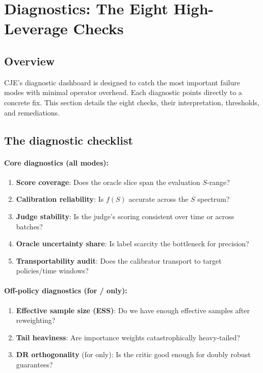 \section{Diagnostics: The Eight High-Leverage Checks}

\subsection{Overview}

CJE's diagnostic dashboard is designed to catch the most important failure modes with minimal operator overhead. Each diagnostic points directly to a concrete fix. This section details the eight checks, their interpretation, thresholds, and remediations.

\subsection{The diagnostic checklist}

\paragraph{Core diagnostics (all modes):}
\begin{enumerate}
\item \textbf{Score coverage}: Does the oracle slice span the evaluation $S$-range?
\item \textbf{Calibration reliability}: Is $f(S)$ accurate across the $S$ spectrum?
\item \textbf{Judge stability}: Is the judge's scoring consistent over time or across batches?
\item \textbf{Oracle uncertainty share}: Is label scarcity the bottleneck for precision?
\item \textbf{Transportability audit}: Does the calibrator transport to target policies/time windows?
\end{enumerate}

\paragraph{Off-policy diagnostics (for \ips/\dr{} only):}
\begin{enumerate}[resume]
\item \textbf{Effective sample size (ESS)}: Do we have enough effective samples after reweighting?
\item \textbf{Tail heaviness}: Are importance weights catastrophically heavy-tailed?
\item \textbf{DR orthogonality} (for \dr{} only): Is the critic good enough for doubly robust guarantees?
\end{enumerate}

